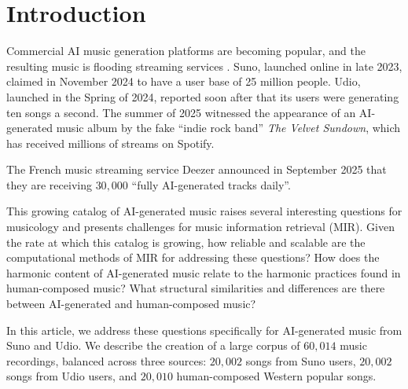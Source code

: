 \documentclass{article}
\begin{document}

\section{Introduction}

Commercial AI music generation platforms are becoming popular, and the resulting music is flooding streaming services \citep{Sturm2024a}. Suno, launched online in late 2023, claimed in November 2024 to have a user base of 25 million people. Udio,
launched in the Spring of 2024, reported soon after that its users were generating ten songs a second.
The summer of 2025 witnessed the appearance of an AI-generated music album by the fake ``indie rock band'' {\em The Velvet Sundown}, which has received millions of streams on Spotify.

The French music streaming service Deezer announced in September 2025 that they are receiving $30,000$ ``fully AI-generated tracks daily''.

This growing catalog of AI-generated music raises several interesting questions for musicology and presents challenges for music information retrieval (MIR). Given the rate at which this catalog is growing, how reliable and scalable are the computational methods of MIR for addressing these questions? How does the harmonic content of AI-generated music relate to the harmonic practices found in human-composed music? What structural similarities and differences are there between AI-generated and human-composed music?

In this article, we address these questions specifically for AI-generated music from Suno and Udio. We describe the creation of a large corpus of $60,014$ music recordings, balanced across three sources: $20,002$ songs from Suno users, $20,002$ songs from Udio users, and $20,010$ human-composed Western popular songs.
\end{document}
